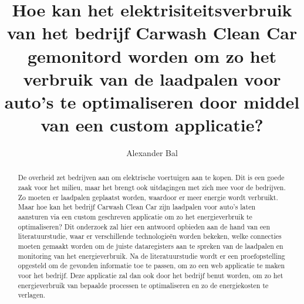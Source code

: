\documentclass{hogent-article}
\title{Hoe kan het elektrisiteitsverbruik van het bedrijf Carwash Clean Car gemonitord worden om zo het verbruik van de laadpalen voor auto's te optimaliseren door middel van een custom applicatie?}
\author{Alexander Bal}
\begin{document}
\begin{abstract}
  De overheid zet bedrijven aan om elektrische voertuigen aan te kopen. Dit is een goede zaak voor het milieu, maar het brengt ook uitdagingen met zich mee voor de bedrijven. Zo moeten er laadpalen geplaatst worden, waardoor er meer energie wordt verbruikt. Maar hoe kan het bedrijf Carwash Clean Car zijn laadpalen voor auto's laten aansturen via een custom geschreven applicatie om zo het energieverbruik te optimaliseren? Dit onderzoek zal hier een antwoord opbieden aan de hand van een literatuurstudie, waar er verschillende technologieën worden bekeken, welke connecties moeten gemaakt worden om de juiste dataregisters aan te spreken van de laadpalen en monitoring van het energieverbruik. Na de literatuurstudie wordt er een proefopstelling opgesteld om de gevonden informatie toe te passen, om zo een web applicatie te maken voor het bedrijf. Deze applicatie zal dan ook door het bedrijf benut worden, om zo het energieverbruik van bepaalde processen te optimaliseren en zo de energiekosten te verlagen.
 \end{abstract}

\tableofcontents



\printbibliography[heading=bibintoc]
\end{document}
